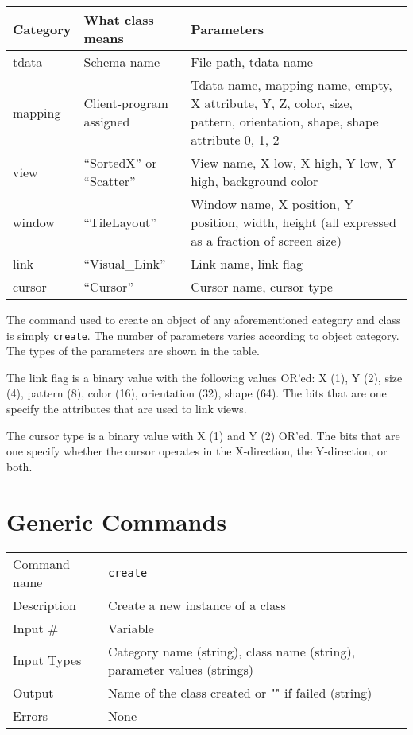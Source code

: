 \noindent
\begin{tabular}{l|l|p{4in}}
Category & What class means           & Parameters\\
\hline
tdata    & Schema name                & File path, tdata name \\
mapping  & Client-program assigned    & Tdata name, mapping name, empty,
                                        X attribute, Y, Z, color, size,
                                        pattern, orientation, shape,
                                        shape attribute 0, 1, 2 \\
view     & ``SortedX'' or ``Scatter'' & View name, X low, X high, Y low,
                                        Y high, background color \\
window   & ``TileLayout''             & Window name, X position, Y position,
                                        width, height (all expressed as a
                                        fraction of screen size) \\
link     & ``Visual\_Link''           & Link name, link flag \\
cursor   & ``Cursor''                 & Cursor name, cursor type \\
\hline
\end{tabular}

\bigskip

The command used to create an object of any aforementioned category
and class is simply {\tt create}. The number of parameters varies
according to object category. The types of the parameters are shown in
the table.

The link flag is a binary value with the following values OR'ed: X
(1), Y (2), size (4), pattern (8), color (16), orientation (32), shape
(64). The bits that are one specify the attributes that are used to
link views.

The cursor type is a binary value with X (1) and Y (2) OR'ed. The bits
that are one specify whether the cursor operates in the X-direction,
the Y-direction, or both.

\section{Generic Commands}

\noindent
\begin{tabular}{l|p{5in}}
\hline
Command name & {\tt create} \\
Description  & Create a new instance of a class \\
Input \#     & Variable \\
Input Types  & Category name (string), class name (string), parameter values
               (strings) \\
Output       & Name of the class created or "" if failed (string) \\
Errors       & None \\
\hline
\end{tabular}

